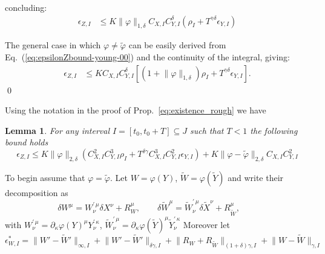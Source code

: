 \documentclass[a4paper,12pt,reqno]{amsproc}
\newcommand{\der}{\delta\!}
\newcommand{\norm}[1]{\lVert #1\rVert}
\newcommand{\wt}{\widetilde}
\newtheorem{lemma}{Lemma}
\begin{document}
concluding:
\begin{equation}
\label{eq:epsilonZbound-young-00}
  \begin{split}
  \epsilon_{Z,I} &  \le K \norm{\varphi}_{1,\delta} C_{X,I}
  C_{Y,I}^\delta (\rho_I + T^{\gamma\delta} \epsilon_{Y,I})
  \end{split}
\end{equation}

The general case in which $\varphi \neq \wt\varphi$ can be easily
derived from Eq.~(\ref{eq:epsilonZbound-young-00}) and the continuity
of the integral, giving:
\begin{equation*}
  \begin{split}
  \epsilon_{Z,I} &  \le K  C_{X,I}
  C_{Y,I}^\delta [(1+\norm{\varphi}_{1,\delta})\rho_I + T^{\gamma\delta} \epsilon_{Y,I}].
  \end{split}
\end{equation*}
\qed


Using the notation in the proof of Prop.~\ref{eq:existence_rough} we have
\begin{lemma}
\label{lemma:zetabound-rough}
For any interval $I=[t_0,t_0+T] \subseteq J$ such that $T<1$
the following bound holds
\begin{equation}
\label{eq:zetabound-lemma}
   \epsilon_{Z,I} \le K  \norm{\varphi}_{2,\delta}(C_{X,I}^2 C_{Y,I}^3
   \rho_I + T^{\delta\gamma} C_{X,I}^3 C_{Y,I}^2 \epsilon_{Y,I}) + K 
\norm{\varphi-\wt \varphi}_{2,\delta} C_{X,I} C_{Y,I}^2
 \end{equation}  
\end{lemma}

\proof To begin assume that $\varphi = \wt \varphi$.
Let  $W = \varphi(Y)$, $\widetilde W = \varphi(\widetilde Y)$
and
write their decomposition as
$$
\der W^\mu = W^{\prime\,\mu}_{\nu} \der X^\nu + R^\mu_W, \qquad 
\der \widetilde W^\mu = \widetilde W^{\prime\,\mu}_{\nu} \der \widetilde X^\nu + R^\mu_{\widetilde W}, \qquad 
$$
with $W^{\prime\,\mu}_{\nu} = \partial_\kappa \varphi(Y)^{\mu}
Y^{\prime\,\kappa}_{\nu}$, $\widetilde W^{\prime\,\mu}_{\nu} = \partial_\kappa
\varphi(\widetilde Y)^{\mu} \widetilde Y^{\prime\,\kappa}_{\nu}$ 
Moreover let
\begin{equation*}
  \epsilon_{W,I}^* = \norm{W'-\wt W'}_{\infty,I} +  \norm{W'-\wt
  W'}_{\delta\gamma,I} + \norm{R_W+R_{\wt W}}_{(1+\delta)\gamma,I} +  \norm{W -\wt
  W}_{\gamma,I} 
\end{equation*}
\end{document}
